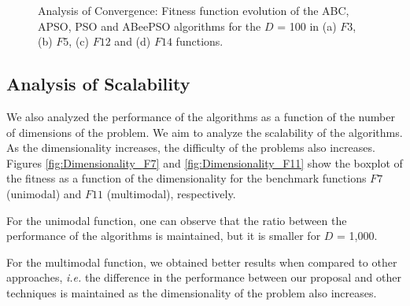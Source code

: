\begin{figure}[!h]
\hspace{1mm}
\caption{\small{Analysis of Convergence: Fitness function evolution of the ABC, APSO, PSO and ABeePSO algorithms for the $D$ = 100 in (a) $F3$, (b) $F5$, (c) $F12$ and (d) $F14$ functions.}}
\label{fig:Convergence}
\end{figure}

\subsection{Analysis of Scalability}
We also analyzed the performance of the algorithms as a function of the number of dimensions of the problem. We aim to analyze the scalability of the algorithms. As the dimensionality increases, the difficulty of the problems also increases. Figures \ref{fig:Dimensionality_F7} and \ref{fig:Dimensionality_F11} show the boxplot of the fitness as a function of the dimensionality for the benchmark functions $F7$ (unimodal) and $F11$ (multimodal), respectively.

For the unimodal function, one can observe that the ratio between the performance of the algorithms is maintained, but it is smaller for $D$ = 1,000.

For the multimodal function, we obtained better results when compared to other approaches, \textit{i.e.} the difference in the performance between our proposal and other techniques is maintained as the dimensionality of the problem also increases.

